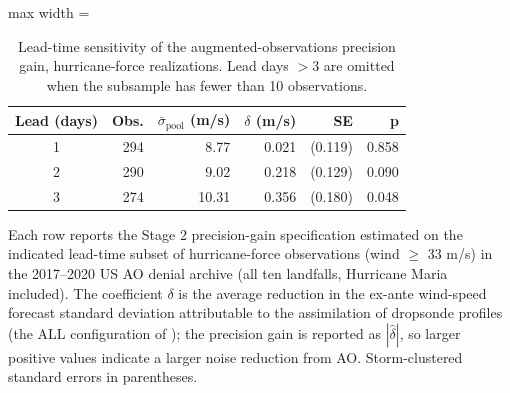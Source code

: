 \begin{table}

\caption{Lead-time sensitivity of the augmented-observations precision gain, hurricane-force realizations. Lead days $>3$ are omitted when the subsample has fewer than 10 observations. \label{tab:appB_leadtime}}
\centering
\begin{adjustbox}{max width = \textwidth}
\begin{threeparttable}
\begin{tabular}[t]{crrrrr}
\toprule
Lead (days) & Obs. & $\bar{\sigma}_{\text{pool}}$ (m/s) & $\delta$ (m/s) & SE & p\\
\midrule
1 & 294 & 8.77 & 0.021 & (0.119) & 0.858\\
2 & 290 & 9.02 & 0.218 & (0.129) & 0.090\\
3 & 274 & 10.31 & 0.356 & (0.180) & 0.048\\
\bottomrule
\end{tabular}
\begin{tablenotes}
\small
\item Each row reports the Stage 2 precision-gain specification estimated on the indicated lead-time subset of hurricane-force observations (wind $\geq$ 33 m/s) in the 2017--2020 US AO denial archive (all ten landfalls, Hurricane Maria included). The coefficient $\delta$ is the average reduction in the ex-ante wind-speed forecast standard deviation attributable to the assimilation of dropsonde profiles (the ALL configuration of \citet{DitchekEA2023}); the precision gain is reported as $|\hat{\delta}|$, so larger positive values indicate a larger noise reduction from AO. Storm-clustered standard errors in parentheses.
\end{tablenotes}
\end{threeparttable}
\end{adjustbox}
\end{table}
